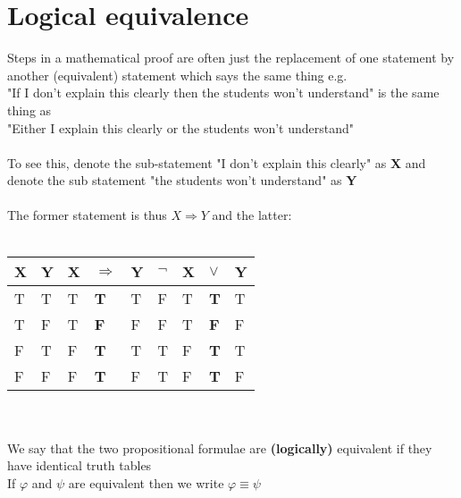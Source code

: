 \documentclass{article}[18pt]
\begin{document}
\section{Logical equivalence}
Steps in a mathematical proof are often just the replacement of one statement by another (equivalent) statement which says the same thing e.g.\\
"If I don't explain this clearly then the students won't understand" is the same thing as\\
"Either I explain this clearly or the students won't understand"\\
\\
To see this, denote the sub-statement "I don't explain this clearly" as \textbf{X} and\\
denote the sub statement "the students won't understand" as \textbf{Y}\\
\\
The former statement is thus $X\Rightarrow Y$ and the latter:\\
\\
\begin{tabular}{|l|l|lll|llll}
\cline{1-2}
X & Y & X & $\Rightarrow$ & Y & $\lnot$ & X & $\lor$     & Y \\ \hline
T & T & T & \textbf{T}    & T & F       & T & \textbf{T} & T \\ \cline{1-2}
T & F & T & \textbf{F}    & F & F       & T & \textbf{F} & F \\ \cline{1-2}
F & T & F & \textbf{T}    & T & T       & F & \textbf{T} & T \\ \cline{1-2}
F & F & F & \textbf{T}    & F & T       & F & \textbf{T} & F \\ \cline{1-2}
\end{tabular}\\
\\
We say that the two propositional formulae are \textbf{(logically)} equivalent if they have identical truth tables\\
If $\varphi$ and $\psi$ are equivalent then we write $\varphi\equiv\psi$
\end{document}
